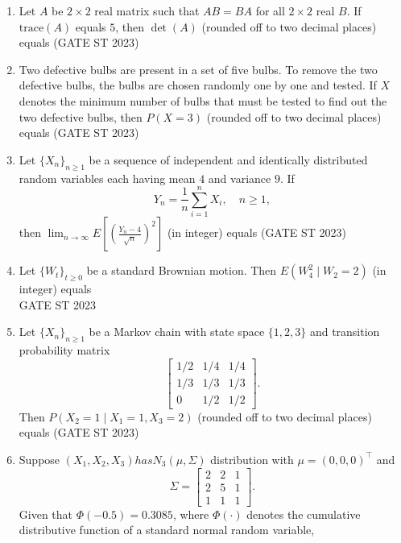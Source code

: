 \documentclass[journal]{IEEEtran}
\begin{document}
\begin{enumerate}[label=\textbf{Q.\arabic*.}, start=1, align=left, itemsep=2em]
\begin{enumerate}[label=\textbf{Q.\arabic*.}, start=11, align=left, itemsep=2em]
\item Let $A$ be $2\times 2$ real matrix such that $AB=BA$ for all $2\times2$ real $B$. If $\mathrm{trace}(A)$ equals $5$, then $\det(A)$ (rounded off to two decimal places) equals \underline{\hspace{3cm}}\hfill(GATE ST 2023)



\item Two defective bulbs are present in a set of five bulbs. To remove the two defective bulbs, the bulbs are chosen randomly one by one and tested. If $X$ denotes the minimum number of bulbs that must be tested to find out the two defective bulbs, then $P(X=3)$ (rounded off to two decimal places) equals \underline{\hspace{3cm}}\hfill(GATE ST 2023)

\item Let $\{X_n\}_{n\ge 1}$ be a sequence of independent and identically distributed random variables each having mean $4$ and variance $9$. If 
\[
Y_n = \frac{1}{n} \sum_{i=1}^n X_i, \quad n \ge 1,
\]
then $\lim_{n\to\infty} E\left[ \left( \frac{Y_n - 4}{\sqrt{n}} \right)^2 \right]$ (in integer) equals \underline{\hspace{3cm}}\hfill(GATE ST 2023)

\item Let $\{W_t\}_{t\ge 0}$ be a standard Brownian motion. Then $E(W_4^2 \mid W_2 = 2)$ (in integer) equals \underline{\hspace{3cm}}\\
\hspace*{15.7cm}GATE ST 2023

\item Let $\{X_n\}_{n\ge 1}$ be a Markov chain with state space $\{1,2,3\}$ and transition probability matrix
\[
\begin{bmatrix}
1/2 & 1/4 & 1/4 \\
1/3 & 1/3 & 1/3 \\
0 & 1/2 & 1/2
\end{bmatrix}.
\]
Then $P(X_2 = 1 \mid X_1 = 1, X_3 = 2)$ (rounded off to two decimal places) equals \underline{\hspace{3cm}}\hfill(GATE ST 2023)

\item Suppose $(X_1, X_2, X_3) has N_3(\mu, \Sigma)$ distribution with $\mu = (0,0,0)^\top$ and
\[
\Sigma =
\begin{bmatrix}
2 & 2 & 1 \\
2 & 5 & 1 \\
1 & 1 & 1
\end{bmatrix}.
\]
Given that $\Phi(-0.5) = 0.3085$, where $\Phi(\cdot)$ denotes the cumulative distributive function of a standard normal random variable,\\


\end{enumerate}
\end{enumerate}
\end{document}
